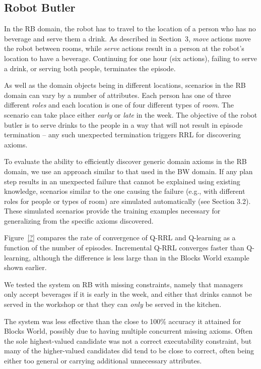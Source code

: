 


\subsection{Robot Butler}

In the RB domain, the robot has to travel to the location of a person who 
has no beverage and serve them a drink. As described in Section~3, 
\textit{move} actions move the robot between rooms, while \textit{serve} 
actions result in a person at the robot's location to have a beverage. 
Continuing for one hour (six actions), failing to serve a drink, or serving 
both people, terminates the episode.

As well as the domain objects being in different locations, scenarios in the RB 
domain can vary by a number of attributes. 
Each person has one of three different \textit{roles} and each location is one 
of four different types of \textit{room}. The scenario can take place either 
\textit{early} or \textit{late} in the week. 
The objective of the robot butler is to serve drinks to the people in a way 
that will not result in episode termination -- any such unexpected termination 
triggers RRL for discovering axioms.

To evaluate the ability to efficiently discover generic domain axioms in the RB 
domain, we use an approach similar to that used in the BW domain. If any plan 
step results in an unexpected failure that cannot be explained using existing 
knowledge, scenarios similar to the one causing the failure (e.g., with different 
roles for people or types of room) are simulated automatically (see Section 3.2). 
These simulated scenarios provide the training examples necessary for 
generalizing from the specific axioms discovered. 

Figure~\ref{?} compares the rate of convergence of Q-RRL and Q-learning as 
a function of the number of episodes. Incremental Q-RRL converges faster than 
Q-learning, although the difference is less large than in the Blocks World example 
shown earlier. 

We tested the system on RB with missing constraints, namely that managers only accept 
beverages if it is early in the week, and either that drinks cannot be served in the 
workshop or that they can \textit{only} be served in the kitchen.

The system was less effective than the close to 100\% accuracy it attained for 
Blocks World, possibly due to having multiple concurrent missing axioms. 
Often the sole highest-valued candidate was not a correct executability constraint, 
but many of the higher-valued candidates did tend to be close to correct, often 
being either too general or carrying additional unnecessary attributes.

